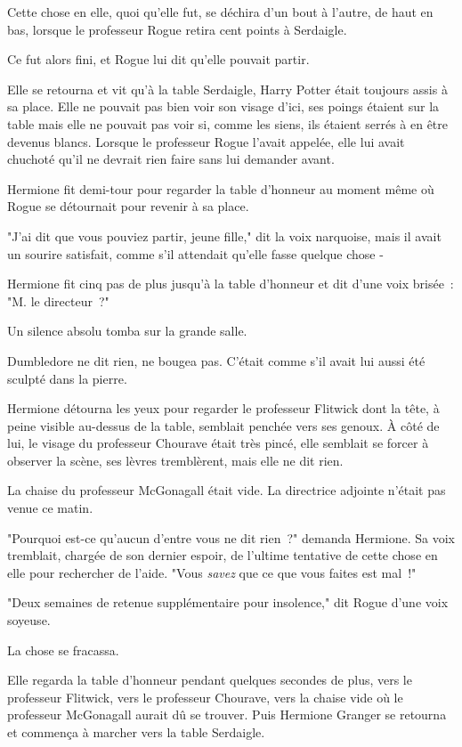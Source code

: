 Cette chose en elle, quoi qu'elle fut, se déchira d'un bout à l'autre, de haut en bas, lorsque le professeur Rogue retira cent points à Serdaigle.

Ce fut alors fini, et Rogue lui dit qu'elle pouvait partir.

Elle se retourna et vit qu'à la table Serdaigle, Harry Potter était toujours assis à sa place. Elle ne pouvait pas bien voir son visage d'ici, ses poings étaient sur la table mais elle ne pouvait pas voir si, comme les siens, ils étaient serrés à en être devenus blancs. Lorsque le professeur Rogue l'avait appelée, elle lui avait chuchoté qu'il ne devrait rien faire sans lui demander avant.

Hermione fit demi-tour pour regarder la table d'honneur au moment même où Rogue se détournait pour revenir à sa place.

"J'ai dit que vous pouviez partir, jeune fille," dit la voix narquoise, mais il avait un sourire satisfait, comme s'il attendait qu'elle fasse quelque chose -

Hermione fit cinq pas de plus jusqu'à la table d'honneur et dit d'une voix brisée~: "M. le directeur~?"

Un silence absolu tomba sur la grande salle.

Dumbledore ne dit rien, ne bougea pas. C'était comme s'il avait lui aussi été sculpté dans la pierre.

Hermione détourna les yeux pour regarder le professeur Flitwick dont la tête, à peine visible au-dessus de la table, semblait penchée vers ses genoux. À côté de lui, le visage du professeur Chourave était très pincé, elle semblait se forcer à observer la scène, ses lèvres tremblèrent, mais elle ne dit rien.

La chaise du professeur McGonagall était vide. La directrice adjointe n'était pas venue ce matin.

"Pourquoi est-ce qu'aucun d'entre vous ne dit rien~?" demanda Hermione. Sa voix tremblait, chargée de son dernier espoir, de l'ultime tentative de cette chose en elle pour rechercher de l'aide. "Vous \emph{savez} que ce que vous faites est mal~!"

"Deux semaines de retenue supplémentaire pour insolence," dit Rogue d'une voix soyeuse.

La chose se fracassa.

Elle regarda la table d'honneur pendant quelques secondes de plus, vers le professeur Flitwick, vers le professeur Chourave, vers la chaise vide où le professeur McGonagall aurait dû se trouver. Puis Hermione Granger se retourna et commença à marcher vers la table Serdaigle.

